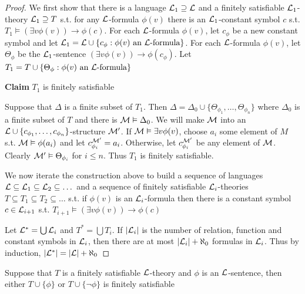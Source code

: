 \documentclass[11pt]{article}
\begin{document}
\begin{proof}
We first show that there is a language \(\mathcal{L}_1\supseteq\mathcal{L}\) and a
finitely satisfiable \(\mathcal{L}_1\)-theory \(\mathcal{L}_1\supseteq T\) s.t. for any
\(\mathcal{L}\)-formula \(\phi(v)\) there is an \(\mathcal{L}_1\)-constant symbol \(c\) s.t.
\(T_1\vDash(\exists v\phi(v))\to\phi(c)\). For each \(\mathcal{L}\)-formula
\(\phi(v)\), let \(c_\phi\) be a new constant symbol and let
\(\mathcal{L}_1=\mathcal{L}\cup\{c_\phi:\phi(v)\text{ an }\mathcal{L}\text{-formula}\}\). For
each \(\mathcal{L}\)-formula \(\phi(v)\), let \(\Theta_\phi\) be the
\(\mathcal{L}_1\)-sentence
\((\exists v\phi(v))\to\phi(c_\phi)\). Let
\(T_1=T\cup\{\Theta_\phi:\phi(v)\text{ an }\mathcal{L}\text{-formula}\}\)

\textbf{Claim} \(T_1\) is finitely satisfiable

Suppose that \(\Delta\) is a finite subset of \(T_1\). Then
\(\Delta=\Delta_0\cup\{\Theta_{\phi_1},\dots, \Theta_{\phi_n}\}\) where
\(\Delta_0\) is a finite subset of \(T\) and there is \(\mathcal{M}\vDash\Delta_0\). We
will make \(\mathcal{M}\) into an
\(\mathcal{L}\cup\{c_{\phi_1},\dots,c_{\phi_n}\}\)-structure \(\mathcal{M}'\). If
\(\mathcal{M}\vDash\exists v\phi(v)\), choose \(a_i\) some element of \(M\) s.t.
\(\mathcal{M}\vDash\phi(a_i)\) and let \(c_{\phi_i}^{\mathcal{M}'}=a_i\). Otherwise, let
\(c_{\phi_i}^{\mathcal{M}'}\) be any element of \(\mathcal{M}\). Clearly
\(\mathcal{M}'\vDash\Theta_{\phi_i}\) for \(i\le n\). Thus \(T_1\) is finitely
satisfiable.

We now iterate the construction above to build a sequence of languages
\(\mathcal{L}\subseteq\mathcal{L}_1\subseteq\mathcal{L}_2\subseteq\dots\) and a sequence of
finitely satisfiable \(\mathcal{L}_i\)-theories \(T\subseteq T_1\subseteq
    T_2\subseteq\dots\) s.t. if \(\phi(v)\) is an \(\mathcal{L}_i\)-formula then there is
a constant symbol \(c\in\mathcal{L}_{i+1}\) s.t. \(T_{i+1}\vDash(\exists
    v\phi(v))\to\phi(c)\)

Let \(\mathcal{L}^*=\bigcup\mathcal{L}_i\) and \(T^*=\bigcup T_i\). 
If \(\abs{\call_i}\) is the number of relation, function and constant
symbols in \(\mathcal{L}_i\), then there are at most \(\abs{\call_i}+\aleph_0\)
formulas in \(\mathcal{L}_i\).
Thus by induction,
\(\abs{\call^*}=\abs{\call}+\aleph_0\) 
\end{proof}

\begin{lemma}[]
\label{2.1.9}
Suppose that \(T\) is a finitely satisfiable \(\mathcal{L}\)-theory and \(\phi\) is an
\(\mathcal{L}\)-sentence, then either \(T\cup\{\phi\}\) or \(T\cup\{\neg\phi\}\) is
finitely satisfiable
\end{lemma}
\end{document}
